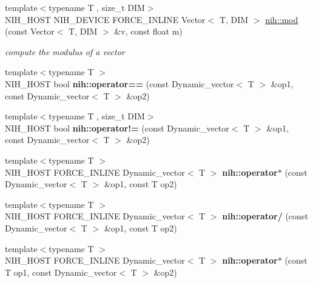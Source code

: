 \begin{DoxyCompactItemize}
{\footnotesize template$<$typename T , size\-\_\-t \-D\-I\-M$>$ }\\\-N\-I\-H\-\_\-\-H\-O\-S\-T \-N\-I\-H\-\_\-\-D\-E\-V\-I\-C\-E \*
\-F\-O\-R\-C\-E\-\_\-\-I\-N\-L\-I\-N\-E \-Vector$<$ \-T, \-D\-I\-M $>$ \hyperlink{group__linalg_ga278bc40e135ff21dd4c80375feccc703}{nih\-::mod} (const \-Vector$<$ \-T, \-D\-I\-M $>$ \&v, const float m)
\begin{DoxyCompactList}\small\item\em compute the modulus of a vector \end{DoxyCompactList}\item 
\hypertarget{group__linalg_ga42ddf0baa76ea97ab1ba69f017746b64}{
{\footnotesize template$<$typename T $>$ }\\\-N\-I\-H\-\_\-\-H\-O\-S\-T bool {\bfseries nih\-::operator==} (const \-Dynamic\-\_\-vector$<$ \-T $>$ \&op1, const \-Dynamic\-\_\-vector$<$ \-T $>$ \&op2)}
\label{group__linalg_ga42ddf0baa76ea97ab1ba69f017746b64}

\item 
\hypertarget{group__linalg_ga19ea070e035fcdc97bbab34cdfde4c10}{
{\footnotesize template$<$typename T , size\-\_\-t \-D\-I\-M$>$ }\\\-N\-I\-H\-\_\-\-H\-O\-S\-T bool {\bfseries nih\-::operator!=} (const \-Dynamic\-\_\-vector$<$ \-T $>$ \&op1, const \-Dynamic\-\_\-vector$<$ \-T $>$ \&op2)}
\label{group__linalg_ga19ea070e035fcdc97bbab34cdfde4c10}

\item 
\hypertarget{group__linalg_gad6b82f45e24cda7119205693d7235750}{
{\footnotesize template$<$typename T $>$ }\\\-N\-I\-H\-\_\-\-H\-O\-S\-T \-F\-O\-R\-C\-E\-\_\-\-I\-N\-L\-I\-N\-E \*
\-Dynamic\-\_\-vector$<$ \-T $>$ {\bfseries nih\-::operator$\ast$} (const \-Dynamic\-\_\-vector$<$ \-T $>$ \&op1, const \-T op2)}
\label{group__linalg_gad6b82f45e24cda7119205693d7235750}

\item 
\hypertarget{group__linalg_ga866cbec9ab0c98fda2dd23d72fa3394c}{
{\footnotesize template$<$typename T $>$ }\\\-N\-I\-H\-\_\-\-H\-O\-S\-T \-F\-O\-R\-C\-E\-\_\-\-I\-N\-L\-I\-N\-E \*
\-Dynamic\-\_\-vector$<$ \-T $>$ {\bfseries nih\-::operator/} (const \-Dynamic\-\_\-vector$<$ \-T $>$ \&op1, const \-T op2)}
\label{group__linalg_ga866cbec9ab0c98fda2dd23d72fa3394c}

\item 
\hypertarget{group__linalg_gaa682bf56e1568bea95c4a02ef638ed42}{
{\footnotesize template$<$typename T $>$ }\\\-N\-I\-H\-\_\-\-H\-O\-S\-T \-F\-O\-R\-C\-E\-\_\-\-I\-N\-L\-I\-N\-E \*
\-Dynamic\-\_\-vector$<$ \-T $>$ {\bfseries nih\-::operator$\ast$} (const \-T op1, const \-Dynamic\-\_\-vector$<$ \-T $>$ \&op2)}
\label{group__linalg_gaa682bf56e1568bea95c4a02ef638ed42}


\end{DoxyCompactItemize}
